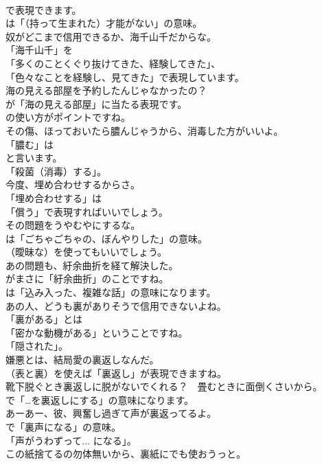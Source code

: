 \documentclass[8pt]{extreport}
\begin{document}
\begin{CJK}{UTF8}{min}
\\	で表現できます。
\\	は「（持って生まれた）才能がない」の意味。	
\\	奴がどこまで信用できるか、海千山千だからな。 
\\	「海千山千」を
\\	「多くのことくぐり抜けてきた、経験してきた」、
\\	「色々なことを経験し、見てきた」で表現しています。	
\\	海の見える部屋を予約したんじゃなかったの？ 
\\	が「海の見える部屋」に当たる表現です。
\\	の使い方がポイントですね。	
\\	その傷、ほっておいたら膿んじゃうから、消毒した方がいいよ。 
\\	「膿む」は
\\	と言います。
\\	「殺菌（消毒）する」。	
\\	今度、埋め合わせするからさ。 
\\	「埋め合わせする」は
\\	「償う」で表現すればいいでしょう。	
\\	その問題をうやむやにするな。 
\\	は「ごちゃごちゃの、ぼんやりした」の意味。
\\	（曖昧な）を使ってもいいでしょう。	
\\	あの問題も、紆余曲折を経て解決した。 
\\	がまさに「紆余曲折」のことですね。
\\	は「込み入った、複雑な話」の意味になります。	
\\	あの人、どうも裏がありそうで信用できないよね。 
\\	「裏がある」とは
\\	「密かな動機がある」ということですね。
\\	「隠された」。	
\\	嫌悪とは、結局愛の裏返しなんだ。 
\\	（表と裏）を使えば「裏返し」が表現できますね。	
\\	靴下脱ぐとき裏返しに脱がないでくれる？　畳むときに面倒くさいから。 
\\	で「…を裏返しにする」の意味になります。	
\\	あーあー、彼、興奮し過ぎて声が裏返ってるよ。 
\\	で「裏声になる」の意味。
\\	「声がうわずって... になる」。	
\\	この紙捨てるの勿体無いから、裏紙にでも使おうっと。 

\end{CJK}
\end{document}
